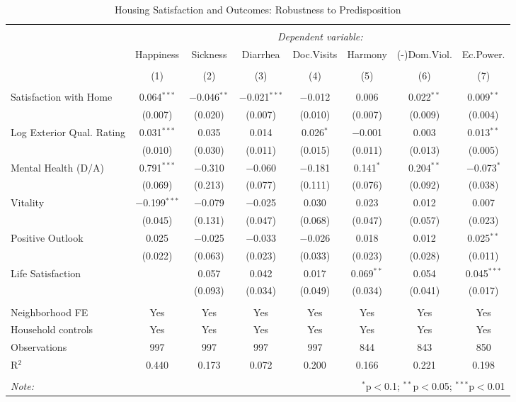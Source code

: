 
\begin{table}[H] \centering 
  \caption{Housing Satisfaction and Outcomes: Robustness to Predisposition } 
  \label{reg_TABLE9} 
\scriptsize 
\begin{tabular}{@{\extracolsep{-7pt}}lccccccc} 
\\[-1.8ex]\hline 
\hline \\[-1.8ex] 
 & \multicolumn{7}{c}{\textit{Dependent variable:}} \\ 
\cline{2-8} 
 & Happiness & Sickness & Diarrhea & Doc.Visits & Harmony & (-)Dom.Viol. & Ec.Power. \\ 
\\[-1.8ex] & (1) & (2) & (3) & (4) & (5) & (6) & (7)\\ 
\hline \\[-1.8ex] 
 Satisfaction with Home & 0.064$^{***}$ & $-$0.046$^{**}$ & $-$0.021$^{***}$ & $-$0.012 & 0.006 & 0.022$^{**}$ & 0.009$^{**}$ \\ 
  & (0.007) & (0.020) & (0.007) & (0.010) & (0.007) & (0.009) & (0.004) \\ 
  Log Exterior Qual. Rating & 0.031$^{***}$ & 0.035 & 0.014 & 0.026$^{*}$ & $-$0.001 & 0.003 & 0.013$^{**}$ \\ 
  & (0.010) & (0.030) & (0.011) & (0.015) & (0.011) & (0.013) & (0.005) \\ 
  Mental Health (D/A) & 0.791$^{***}$ & $-$0.310 & $-$0.060 & $-$0.181 & 0.141$^{*}$ & 0.204$^{**}$ & $-$0.073$^{*}$ \\ 
  & (0.069) & (0.213) & (0.077) & (0.111) & (0.076) & (0.092) & (0.038) \\ 
  Vitality & $-$0.199$^{***}$ & $-$0.079 & $-$0.025 & 0.030 & 0.023 & 0.012 & 0.007 \\ 
  & (0.045) & (0.131) & (0.047) & (0.068) & (0.047) & (0.057) & (0.023) \\ 
  Positive Outlook & 0.025 & $-$0.025 & $-$0.033 & $-$0.026 & 0.018 & 0.012 & 0.025$^{**}$ \\ 
  & (0.022) & (0.063) & (0.023) & (0.033) & (0.023) & (0.028) & (0.011) \\ 
  Life Satisfaction &  & 0.057 & 0.042 & 0.017 & 0.069$^{**}$ & 0.054 & 0.045$^{***}$ \\ 
  &  & (0.093) & (0.034) & (0.049) & (0.034) & (0.041) & (0.017) \\ 
 \hline \\[-1.8ex] 
Neighborhood FE & Yes & Yes & Yes & Yes & Yes & Yes & Yes \\ 
Household controls & Yes & Yes & Yes & Yes & Yes & Yes & Yes \\ 
Observations & 997 & 997 & 997 & 997 & 844 & 843 & 850 \\ 
R$^{2}$ & 0.440 & 0.173 & 0.072 & 0.200 & 0.166 & 0.221 & 0.198 \\ 
\hline 
\hline \\[-1.8ex] 
\textit{Note:}  & \multicolumn{7}{r}{$^{*}$p$<$0.1; $^{**}$p$<$0.05; $^{***}$p$<$0.01} \\ 
\end{tabular} 
\end{table} 
